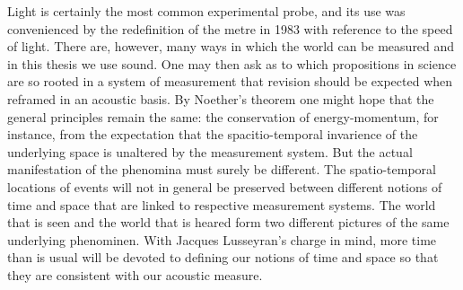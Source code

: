 Light is certainly the most common experimental probe,
and its use was convenienced by the redefinition of the metre in 1983 with reference to the speed of light\cite{CGPM1984}.
There are, however, many ways in which the world can be measured and in this thesis we use sound. 
One may then ask as to which propositions in science are so rooted in a system of measurement
that revision should be expected when reframed in an acoustic basis.
By Noether's theorem one might hope that the general principles remain the same:
the conservation of energy-momentum, for instance,
from the expectation that the spacitio-temporal invarience of the underlying space is unaltered by the measurement system.
But the actual manifestation of the phenomina must surely be different.
The spatio-temporal locations of  events  will not in general be preserved between different notions of time and space that are linked to respective measurement systems.  
%
%  
The world that is seen and the world that is heared form two different pictures of the same underlying phenominen.
%
With Jacques Lusseyran's charge in mind, more time than is usual will be devoted to defining our notions of time and space so that they are consistent with our acoustic measure.







